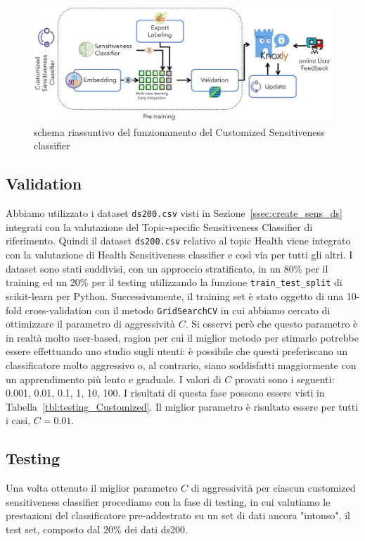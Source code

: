 \begin{figure}[h]
    \centering
    \includegraphics[width=15cm]{Figure/grafici/customized_cropped.pdf}
    \caption{schema riassuntivo del funzionamento del Customized Sensitiveness classifier}
    \label{fig:approccisensCustomized}
\end{figure}
\FloatBarrier

\subsection{Validation}
Abbiamo utilizzato i dataset {\tt ds200.csv} visti in Sezione~\ref{ssec:create_sens_ds} integrati con la valutazione del Topic-specific Sensitiveness Classifier di riferimento. Quindi il dataset {\tt ds200.csv} relativo al topic Health viene integrato con la valutazione di Health Sensitiveness classifier e così via per tutti gli altri.
I dataset sono stati suddivisi, con un approccio stratificato, in un 80\% per il training ed un 20\% per il testing utilizzando la funzione {\tt train\_test\_split} di scikit-learn per Python. Successivamente, il training set è stato oggetto di una 10-fold cross-validation con il metodo {\tt GridSearchCV} in cui abbiamo cercato di ottimizzare il parametro di aggressività $C$. Si osservi però che questo parametro è in realtà molto user-based, ragion per cui il miglior metodo per stimarlo potrebbe essere effettuando uno studio sugli utenti: è possibile che questi preferiscano un classificatore molto aggressivo o, al contrario, siano soddisfatti maggiormente con un apprendimento più lento e graduale. I valori di $C$ provati sono i seguenti: 0.001, 0.01, 0.1, 1, 10, 100. I risultati di questa fase possono essere visti in Tabella~\ref{tbl:testing_Customized}. Il miglior parametro è risultato essere per tutti i casi, $C=0.01$.

\subsection{Testing}
Una volta ottenuto il miglior parametro $C$ di aggressività per ciascun customized sensitiveness classifier procediamo con la fase di testing, in cui valutiamo le prestazioni del classificatore pre-addestrato su un set di dati ancora "intonso", il test set, composto dal 20\% dei dati ds200.

